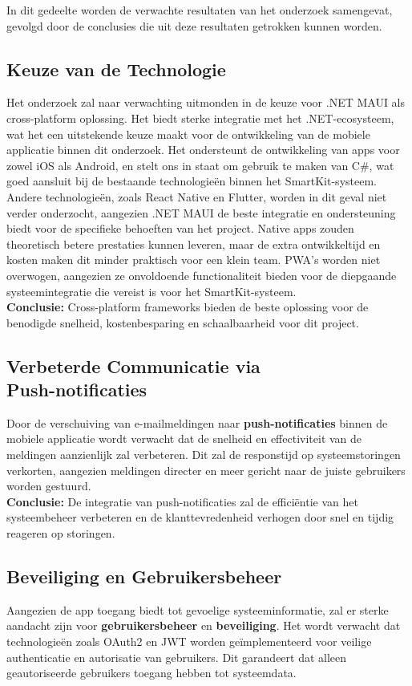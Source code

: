 \noindent In dit gedeelte worden de verwachte resultaten van het onderzoek samengevat, gevolgd door de conclusies die uit deze resultaten getrokken kunnen worden.

\subsection{Keuze van de Technologie}
\noindent Het onderzoek zal naar verwachting uitmonden in de keuze voor .NET MAUI als cross-platform oplossing. Het biedt sterke integratie met het .NET-ecosysteem, wat het een uitstekende keuze maakt voor de ontwikkeling van de mobiele applicatie binnen dit onderzoek. Het ondersteunt de ontwikkeling van apps voor zowel iOS als Android, en stelt ons in staat om gebruik te maken van C#, wat goed aansluit bij de bestaande technologieën binnen het SmartKit-systeem. Andere technologieën, zoals React Native en Flutter, worden in dit geval niet verder onderzocht, aangezien .NET MAUI de beste integratie en ondersteuning biedt voor de specifieke behoeften van het project. Native apps zouden theoretisch betere prestaties kunnen leveren, maar de extra ontwikkeltijd en kosten maken dit minder praktisch voor een klein team. PWA's worden niet overwogen, aangezien ze onvoldoende functionaliteit bieden voor de diepgaande systeemintegratie die vereist is voor het SmartKit-systeem.\\


\noindent \textbf{Conclusie:} Cross-platform frameworks bieden de beste oplossing voor de benodigde snelheid, kostenbesparing en schaalbaarheid voor dit project.

\subsection{Verbeterde Communicatie via \\Push-notificaties}
\noindent Door de verschuiving van e-mailmeldingen naar \textbf{push-notificaties} binnen de mobiele applicatie wordt verwacht dat de snelheid en effectiviteit van de meldingen aanzienlijk zal verbeteren. Dit zal de responstijd op systeemstoringen verkorten, aangezien meldingen directer en meer gericht naar de juiste gebruikers worden gestuurd.\\


\noindent \textbf{Conclusie:} De integratie van push-notificaties zal de efficiëntie van het systeembeheer verbeteren en de klanttevredenheid verhogen door snel en tijdig reageren op storingen.

\subsection{Beveiliging en Gebruikersbeheer}
\noindent Aangezien de app toegang biedt tot gevoelige systeeminformatie, zal er sterke aandacht zijn voor \textbf{gebruikersbeheer} en \textbf{beveiliging}. Het wordt verwacht dat technologieën zoals OAuth2 en JWT worden geïmplementeerd voor veilige authenticatie en autorisatie van gebruikers. Dit garandeert dat alleen geautoriseerde gebruikers toegang hebben tot systeemdata.\\


